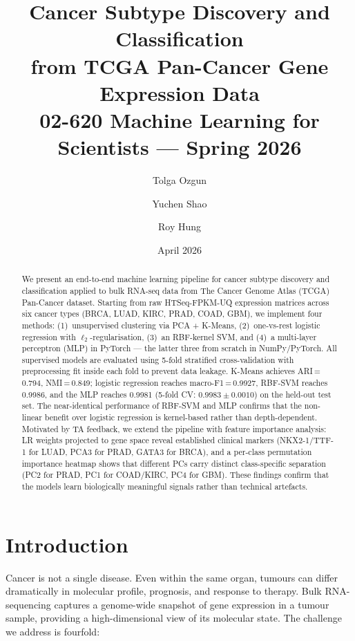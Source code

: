 \documentclass[11pt,letterpaper]{article}
\title{%
  \Large\textbf{Cancer Subtype Discovery and Classification}\\[4pt]
  \large from TCGA Pan-Cancer Gene Expression Data\\[6pt]
  \normalsize 02-620 Machine Learning for Scientists --- Spring 2026
}
\author{Tolga Ozgun \and Yuchen Shao \and Roy Hung}
\date{April 2026}
\begin{document}
\maketitle

\begin{abstract}
We present an end-to-end machine learning pipeline for cancer subtype
discovery and classification applied to bulk RNA-seq data from The Cancer
Genome Atlas (TCGA) Pan-Cancer dataset.  Starting from raw HTSeq-FPKM-UQ
expression matrices across six cancer types (BRCA, LUAD, KIRC, PRAD, COAD,
GBM), we implement four methods: (1)~unsupervised clustering via PCA +
K-Means, (2)~one-vs-rest logistic regression with $\ell_2$-regularisation,
(3)~an RBF-kernel SVM, and (4)~a multi-layer perceptron (MLP) in PyTorch ---
the latter three from scratch in NumPy/PyTorch.  All supervised models are
evaluated using 5-fold stratified cross-validation with preprocessing fit
inside each fold to prevent data leakage.  K-Means achieves ARI\,=\,0.794,
NMI\,=\,0.849; logistic regression reaches macro-F1\,=\,0.9927, RBF-SVM
reaches 0.9986, and the MLP reaches 0.9981 (5-fold CV: $0.9983 \pm 0.0010$)
on the held-out test set.  The near-identical performance of RBF-SVM and MLP
confirms that the non-linear benefit over logistic regression is kernel-based
rather than depth-dependent.  Motivated by TA feedback, we extend the pipeline
with feature importance analysis: LR weights projected to gene space reveal
established clinical markers (NKX2-1/TTF-1 for LUAD, PCA3 for PRAD, GATA3
for BRCA), and a per-class permutation importance heatmap shows that different
PCs carry distinct class-specific separation (PC2 for PRAD, PC1 for COAD/KIRC,
PC4 for GBM).  These findings confirm that the models learn biologically
meaningful signals rather than technical artefacts.
\end{abstract}

\section{Introduction}
\label{sec:intro}

Cancer is not a single disease.  Even within the same organ, tumours can differ
dramatically in molecular profile, prognosis, and response to therapy.  Bulk
RNA-sequencing captures a genome-wide snapshot of gene expression in a tumour
sample, providing a high-dimensional view of its molecular state.  The
challenge we address is fourfold:
\end{document}
